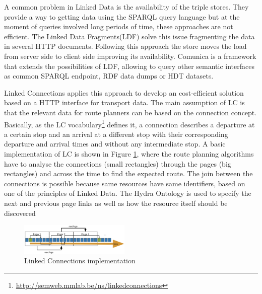 \documentclass[sw]{iosart2x}
\begin{document}
A common problem in Linked Data is the availability of the triple stores. They provide a way to getting data using the SPARQL query language but at the moment of queries involved long periods of time, these approaches are not efficient\cite{verborgh2014querying}. The Linked Data Fragments(LDF)\cite{verborgh2016triple,verborgh2014web} solve this issue fragmenting the data in several HTTP documents. Following this approach the store moves the load from server side to client side improving its availability. Comunica\cite{taelman2018comunica} is a framework that extends the possibilities of LDF, allowing to query other semantic interfaces as common SPARQL endpoint, RDF data dumps or HDT datasets\cite{fernandez2013binary}. 

Linked Connections\cite{colpaert2015intermodal} applies this approach to develop an cost-efficient solution based on a HTTP interface for transport data. The main assumption of LC  is that the relevant data for route planners can be based on the connection concept. Basically, as the LC vocabulary\footnote{\url{http://semweb.mmlab.be/ns/linkedconnections}} defines it, a connection describes a departure at a certain stop and an arrival at a different stop with their corresponding departure and arrival times and without any intermediate stop. A basic implementation of LC is shown in Figure \ref{fig:lc_imp}, where the route planning algorithms have to analyse the connections (small rectangles) through the pages (big rectangles) and across the time to find the expected route. The join between the connections is possible because same resources have same identifiers, based on one of the principles of Linked Data. The Hydra Ontology\cite{lanthaler2013hydra} is used to specify the next and previous page links as well as how the resource itself should be discovered


\begin{figure}[t]
	\includegraphics[width=0.47\textwidth]{images/implementation.png}
	\caption{Linked Connections implementation}\label{fig:lc_imp}
\end{figure}
\end{document}

